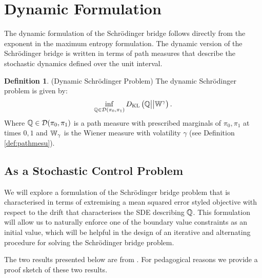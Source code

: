 \documentclass[a4paper,12pt,twoside,openright]{report}
\theoremstyle{definition}
\newtheorem{definition}{Definition}[section]
\begin{document}
\section{Dynamic Formulation}
The dynamic formulation of the Schrödinger bridge follows directly from the exponent in the maximum entropy formulation.  The dynamic version of the Schrödinger bridge is written in terms of path measures that describe the stochastic dynamics defined over the unit interval.
\begin{definition}
    (Dynamic Schrödinger Problem) The dynamic Schrödinger problem is given by:
    \begin{align}
        \inf_{{\mathbb{Q}} \in {\mathcal{D}}(\pi_0, \pi_1)} D_{\mathrm{KL}}\left({\mathbb{Q}} \big|\big| \mathbb{W}^{\gamma}\right).
    \end{align}
    Where ${\mathbb{Q}} \in {\mathcal{D}}(\pi_0, \pi_1)$ is a path measure with prescribed marginals of $\pi_0, \pi_1$ at times $0, 1$ and $\mathbb{W}_{\gamma}$ is the Wiener measure with volatility $\gamma$ (see Definition \ref{def:pathmesu}). 
\end{definition}
\subsection{As a Stochastic Control Problem}

We will explore a formulation of the Schrödinger bridge problem that is characterised in terms of extremising a mean squared error styled objective with respect to the drift that characterises the SDE describing ${\mathbb{Q}}$. This formulation will allow us to naturally enforce one of the boundary value constraints as an initial value, which will be helpful in the design of an iterative and alternating procedure for solving the Schrödinger bridge problem.

The two results presented below are from \cite{pavon1991free}. For pedagogical reasons we provide a proof sketch of these two results.
\end{document}
